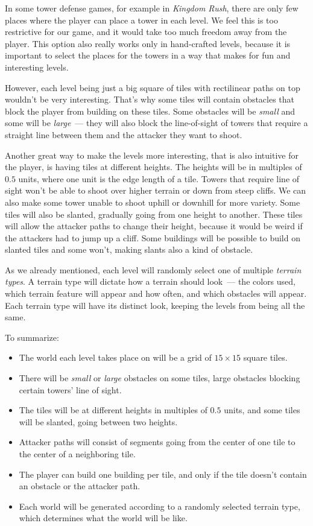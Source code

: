 In some tower defense games, for example in \emph{Kingdom Rush}, there are only few places where the player can place a tower in each level.
We feel this is too restrictive for our game, and it would take too much freedom away from the player.
This option also really works only in hand-crafted levels, because it is important to select the places for the towers in a way that makes for fun and interesting levels.

However, each level being just a big square of tiles with rectilinear paths on top wouldn't be very interesting.
That's why some tiles will contain obstacles that block the player from building on these tiles.
Some obstacles will be \emph{small} and some will be \emph{large}~--- they will also block the line-of-sight of towers that require a straight line between them and the attacker they want to shoot.

Another great way to make the levels more interesting, that is also intuitive for the player, is having tiles at different heights.
The heights will be in multiples of $0.5$ units, where one unit is the edge length of a tile.
Towers that require line of sight won't be able to shoot over higher terrain or down from steep cliffs.
We can also make some tower unable to shoot uphill or downhill for more variety.
Some tiles will also be slanted, gradually going from one height to another.
These tiles will allow the attacker paths to change their height, because it would be weird if the attackers had to jump up a cliff.
Some buildings will be possible to build on slanted tiles and some won't, making slants also a kind of obstacle.

As we already mentioned, each level will randomly select one of multiple \emph{terrain types}.
A terrain type will dictate how a terrain should look~--- the colors used, which terrain feature will appear and how often, and which obstacles will appear.
Each terrain type will have its distinct look, keeping the levels from being all the same.

To summarize:
\begin{itemize}
    \item The world each level takes place on will be a grid of $15 \times 15$ square tiles.
    \item There will be \emph{small} or \emph{large} obstacles on some tiles, large obstacles blocking certain towers' line of sight.
    \item The tiles will be at different heights in multiples of $0.5$ units, and some tiles will be slanted, going between two heights.
    \item Attacker paths will consist of segments going from the center of one tile to the center of a neighboring tile.
    \item The player can build one building per tile, and only if the tile doesn't contain an obstacle or the attacker path.
    \item Each world will be generated according to a randomly selected terrain type, which determines what the world will be like.
\end{itemize}

